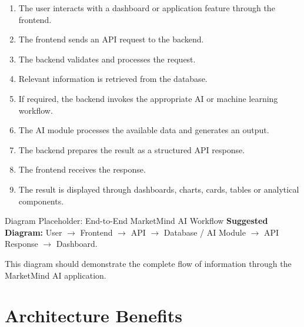 \documentclass[12pt,a4paper]{report}
\begin{document}
\begin{enumerate}[leftmargin=1.2cm]

\item The user interacts with a dashboard or application feature through
the frontend.

\item The frontend sends an API request to the backend.

\item The backend validates and processes the request.

\item Relevant information is retrieved from the database.

\item If required, the backend invokes the appropriate AI or machine
learning workflow.

\item The AI module processes the available data and generates an output.

\item The backend prepares the result as a structured API response.

\item The frontend receives the response.

\item The result is displayed through dashboards, charts, cards,
tables or analytical components.

\end{enumerate}


\begin{screenshotplaceholder}{Diagram Placeholder: End-to-End MarketMind AI Workflow}
\textbf{Suggested Diagram:} User $\rightarrow$ Frontend $\rightarrow$ API
$\rightarrow$ Database / AI Module $\rightarrow$ API Response
$\rightarrow$ Dashboard.

\vspace{0.2cm}

This diagram should demonstrate the complete flow of information through
the MarketMind AI application.
\end{screenshotplaceholder}



\section{Architecture Benefits}
\end{document}
